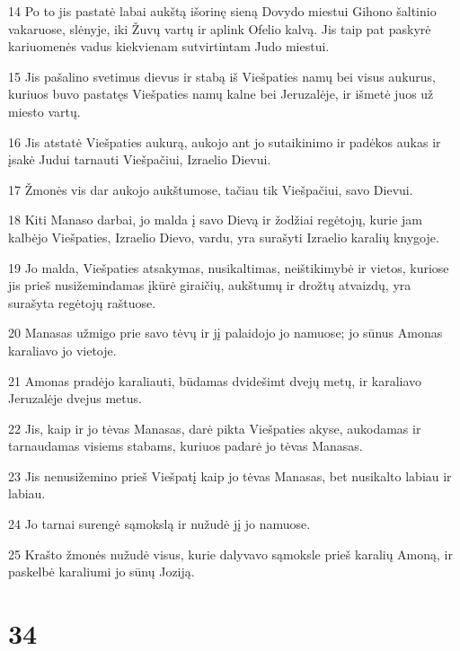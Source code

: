 \par 14 Po to jis pastatė labai aukštą išorinę sieną Dovydo miestui Gihono šaltinio vakaruose, slėnyje, iki Žuvų vartų ir aplink Ofelio kalvą. Jis taip pat paskyrė kariuomenės vadus kiekvienam sutvirtintam Judo miestui. 
\par 15 Jis pašalino svetimus dievus ir stabą iš Viešpaties namų bei visus aukurus, kuriuos buvo pastatęs Viešpaties namų kalne bei Jeruzalėje, ir išmetė juos už miesto vartų. 
\par 16 Jis atstatė Viešpaties aukurą, aukojo ant jo sutaikinimo ir padėkos aukas ir įsakė Judui tarnauti Viešpačiui, Izraelio Dievui. 
\par 17 Žmonės vis dar aukojo aukštumose, tačiau tik Viešpačiui, savo Dievui. 
\par 18 Kiti Manaso darbai, jo malda į savo Dievą ir žodžiai regėtojų, kurie jam kalbėjo Viešpaties, Izraelio Dievo, vardu, yra surašyti Izraelio karalių knygoje. 
\par 19 Jo malda, Viešpaties atsakymas, nusikaltimas, neištikimybė ir vietos, kuriose jis prieš nusižemindamas įkūrė giraičių, aukštumų ir drožtų atvaizdų, yra surašyta regėtojų raštuose. 
\par 20 Manasas užmigo prie savo tėvų ir jį palaidojo jo namuose; jo sūnus Amonas karaliavo jo vietoje. 
\par 21 Amonas pradėjo karaliauti, būdamas dvidešimt dvejų metų, ir karaliavo Jeruzalėje dvejus metus. 
\par 22 Jis, kaip ir jo tėvas Manasas, darė pikta Viešpaties akyse, aukodamas ir tarnaudamas visiems stabams, kuriuos padarė jo tėvas Manasas. 
\par 23 Jis nenusižemino prieš Viešpatį kaip jo tėvas Manasas, bet nusikalto labiau ir labiau. 
\par 24 Jo tarnai surengė sąmokslą ir nužudė jį jo namuose. 
\par 25 Krašto žmonės nužudė visus, kurie dalyvavo sąmoksle prieš karalių Amoną, ir paskelbė karaliumi jo sūnų Joziją.



\chapter{34}


